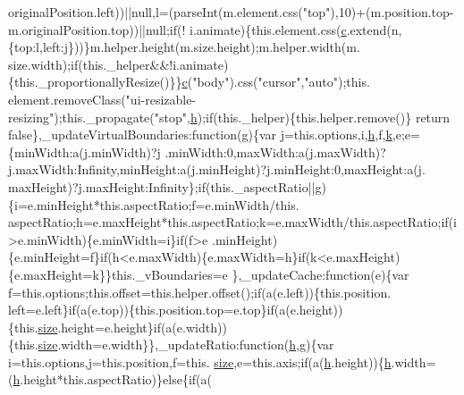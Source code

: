 \begin{DoxyCode}
      originalPosition.left))||null,l=(parseInt(m.element.css(\textcolor{stringliteral}{"top"}),10)+(m.position.top-m.originalPosition.top))||null;\textcolor{keywordflow}{if}(!
      i.animate)\{this.element.css(\hyperlink{jquery_8js_ad171626e81625b5e9f5cb177a3a8fb1c}{c}.extend(n,\{top:l,left:j\}))\}m.helper.height(m.size.height);m.helper.width(m.
      size.width);\textcolor{keywordflow}{if}(this.\_helper&&!i.animate)\{this.\_proportionallyResize()\}\}\hyperlink{jquery_8js_ad171626e81625b5e9f5cb177a3a8fb1c}{c}(\textcolor{stringliteral}{"body"}).css(\textcolor{stringliteral}{"cursor"},\textcolor{stringliteral}{"auto"});this.
      element.removeClass(\textcolor{stringliteral}{"ui-resizable-resizing"});this.\_propagate(\textcolor{stringliteral}{"stop"},\hyperlink{all__1a_8js_aebecdaf2444e2be39f4804412d6a3bf8}{h});\textcolor{keywordflow}{if}(this.\_helper)\{this.helper.remove()\}\textcolor{keywordflow}{
      return} \textcolor{keyword}{false}\},\_updateVirtualBoundaries:\textcolor{keyword}{function}(g)\{var j=this.options,i,\hyperlink{all__1a_8js_aebecdaf2444e2be39f4804412d6a3bf8}{h},f,\hyperlink{jquery_8js_ab26645c014aa005ecedef329ecf58c99}{k},e;e=\{minWidth:a(j.minWidth)?j
      .minWidth:0,maxWidth:a(j.maxWidth)?j.maxWidth:Infinity,minHeight:a(j.minHeight)?j.minHeight:0,maxHeight:a(j.
      maxHeight)?j.maxHeight:Infinity\};\textcolor{keywordflow}{if}(this.\_aspectRatio||g)\{i=e.minHeight*this.aspectRatio;f=e.minWidth/this.
      aspectRatio;h=e.maxHeight*this.aspectRatio;k=e.maxWidth/this.aspectRatio;\textcolor{keywordflow}{if}(i>e.minWidth)\{e.minWidth=i\}\textcolor{keywordflow}{if}(f>e
      .minHeight)\{e.minHeight=f\}\textcolor{keywordflow}{if}(h<e.maxWidth)\{e.maxWidth=h\}\textcolor{keywordflow}{if}(k<e.maxHeight)\{e.maxHeight=k\}\}this.\_vBoundaries=e
      \},\_updateCache:\textcolor{keyword}{function}(e)\{var f=this.options;this.offset=this.helper.offset();\textcolor{keywordflow}{if}(a(e.left))\{this.position.
      left=e.left\}\textcolor{keywordflow}{if}(a(e.top))\{this.position.top=e.top\}\textcolor{keywordflow}{if}(a(e.height))\{this.\hyperlink{all__15_8js_acbd9773931ec61196e11d59d52b43cb3}{size}.height=e.height\}\textcolor{keywordflow}{if}(a(e.width))
      \{this.\hyperlink{all__15_8js_acbd9773931ec61196e11d59d52b43cb3}{size}.width=e.width\}\},\_updateRatio:\textcolor{keyword}{function}(\hyperlink{all__1a_8js_aebecdaf2444e2be39f4804412d6a3bf8}{h},g)\{var i=this.options,j=this.position,f=this.
      \hyperlink{all__15_8js_acbd9773931ec61196e11d59d52b43cb3}{size},e=this.axis;\textcolor{keywordflow}{if}(a(\hyperlink{all__1a_8js_aebecdaf2444e2be39f4804412d6a3bf8}{h}.height))\{\hyperlink{all__1a_8js_aebecdaf2444e2be39f4804412d6a3bf8}{h}.width=(\hyperlink{all__1a_8js_aebecdaf2444e2be39f4804412d6a3bf8}{h}.height*this.aspectRatio)\}\textcolor{keywordflow}{else}\{\textcolor{keywordflow}{if}(a(

\end{DoxyCode}
